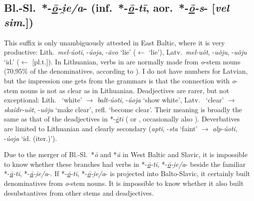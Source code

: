 \documentclass[output=paper,colorlinks,citecolor=brown]{langscibook}
\begin{document}
\subsection{Bl.-Sl.\ *-\textit{\underline{ō}-i̯e/a}- (inf.\ *-\textit{\underline{ō}-tī}, aor.\ *-\textit{\underline{ō}-s}- [\textit{vel sim}.])}
\label{sec:BSloje}

This suffix is only unambiguously attested in East Baltic, where it is very productive: Lith.\ \textit{mel-úoti}, -\textit{úoja}, -\textit{ãvo} ‘lie’ ($\leftarrow$  ‘lie’), Latv.\ \textit{mel-uôt}, -\textit{uõju}, -\textit{uõju} ‘id.’ ($\leftarrow$  [pl.t.]). In Lithuanian, verbs in  are normally made from \textit{o}-stem nouns (70,95\% of the denominatives, according to \citealt[286]{Pakerys2011}). I do not have numbers for Latvian, but the impression one gets from the grammars is that the connection with \textit{o}-stem nouns is not as clear as in Lithuanian. Deadjectives are rarer, but not exceptional: Lith.\  ‘white’ $\rightarrow$ \textit{balt-úoti}, -\textit{úoja} ‘show white’, Latv.\  ‘clear’ $\rightarrow$ \textit{skaĩdr-uôt}, -\textit{uõju} ‘make clear’, refl. ‘become clear’. Their meaning is broadly the same as that of the deadjectives  in *-\textit{\underline{ē}ti} ( or , occasionally also ). Deverbatives are limited to Lithuanian and clearly secondary (\textit{a\ltilded pti}, -\textit{sta} ‘faint’ $\rightarrow$ \textit{alp-úoti}, -\textit{úoja} ‘id. (iter.)’).

Due to the merger of Bl.-Sl.\ *\textit{ō} and *\textit{ā} in West Baltic and Slavic, it is impossible to know whether these branches had verbs in *-\textit{\underline{ō}-tī}, *-\textit{\underline{ō}-i̯e/a}- beside the familiar *-\textit{\underline{ā}-tī}, *-\textit{\underline{ā}-i̯e/a}-. If *-\textit{\underline{ō}-tī}, *-\textit{\underline{ō}-i̯e/a}- is projected into Balto-Slavic, it certainly built denominatives from \textit{o}-stem nouns. It is impossible to know whether it also built desubstantives from other stems and deadjectives.
\end{document}
